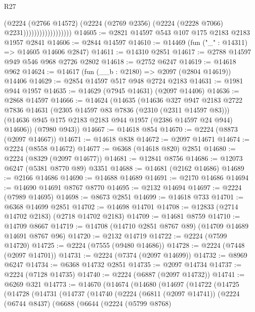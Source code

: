 \begin{lexlean}{R27}
\begin{coremodule}
                                  (@2224
                                    (@2766 @14572)
                                    (@2224
                                      (@2769 @2356)
                                      (@2224 (@2228 @7066) @2231))))))))))))))))))
@14605 := @2821 @14597 @543 @107 @175 @2183 @2183 @1957 @2841
@14606 := @2844 @14597
@14610 := @14469 (fun ("_" : @14311) => @14605 @14606 @2847)
@14611 := @14310 @2851
@14617 := @2788 @14597 @949 @546 @968 @2726 @2802
@14618 := @2752 @6247
@14619 := @14618 @962
@14624 := @14617 (fun (__b : @2180) => @2097 (@2804 @14619)) @14406
@14629 := @2854 @14597 @517 @948 @2724 @2183
@14631 := @1981 @944 @1957
@14635 := @14629 (@7945 @14631) (@2097 @14406)
@14636 := @2868 @14597
@14666 := @14624
    (@14635
      (@14636
        @327
        @947
        @2183
        @2722
        @7836
        @14631
        (@2305 @14597 @83 @7836 (@2310 (@2311 @14597 @83)))
        (@14636 @945 @175 @2183 @2183 @944 @1957 (@2386 @14597 @24 @944) @14606))
      (@7980 @943))
@14667 := @14618 @854
@14670 := @2224 (@8873 (@2097 @14667))
@14671 := @14618 @838
@14672 := @2097 @14671
@14674 := @2224 (@8558 @14672)
@14677 := @6368 (@14618 @820) @2851
@14680 := @2224 (@8329 (@2097 @14677))
@14681 := @12841 @8756
@14686 := @12073 @6247 (@5381 @8770 @89) @3351
@14688 := @14681 (@2162 @14686)
@14689 := @2166 @14686
@14690 := @14688 @14689
@14691 := @2170 @14686
@14694 := @14690 @14691 @8767 @8770
@14695 := @2132 @14694
@14697 := @2224 (@7989 @14695)
@14698 := @8673 @2851
@14699 := @14618 @733
@14701 := @6368 @14699 @2851
@14702 := @14698 @14701
@14708 := @12833 (@2714 @14702 @2183) (@2718 @14702 @2183)
@14709 := @14681 @8759
@14710 := @14709 @8667
@14719 := @14708 (@14710 @2851 @8767 @89) (@14709 @14689 @14691 @8767 @96)
@14720 := @2132 @14719
@14722 := @2224 (@7599 @14720)
@14725 := @2224 (@7555 (@9480 @14686))
@14728 := @2224 (@7448 (@2097 @14701))
@14731 := @2224 (@7374 (@2097 @14699))
@14732 := @8969 @6247
@14734 := @6368 @14732 @2851
@14735 := @2097 @14734
@14737 := @2224 (@7128 @14735)
@14740 := @2224 (@6887 (@2097 @14732))
@14741 := @6269 @321
@14773 := @14670
    (@14674
      (@14680
        (@14697
          (@14722
            (@14725
              (@14728
                (@14731
                  (@14737
                    (@14740
                      (@2224
                        (@6811 (@2097 @14741))
                        (@2224
                          (@6744 @8437)
                          (@6688
                            (@6644
                              (@2224
                                (@5799 @8768)

\end{coremodule}
\end{lexlean}
